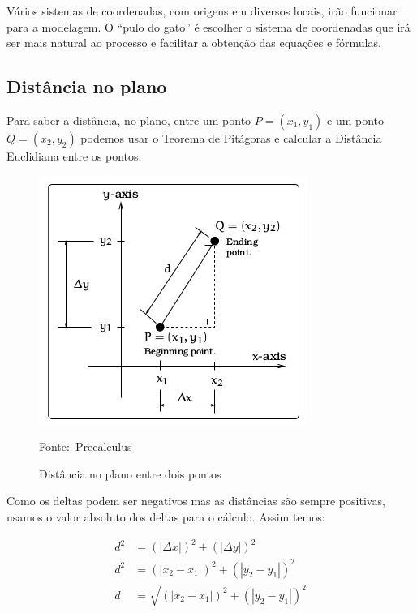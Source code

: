 \documentclass[pdftex, brazil, 12pt, twoside]{article}
\begin{document}
Vários sistemas de coordenadas, com origens em diversos locais, irão funcionar
para a modelagem. O ``pulo do gato'' é escolher o sistema de coordenadas que
irá ser mais natural ao processo e facilitar a obtenção das equações e fórmulas.

\subsection{Distância no plano}
\label{sistema-coordenadas-distancia-plano}

Para saber a distância, no plano, entre um ponto $P = (x_1, y_1)$ e um ponto
$Q = (x_2, y_2)$ podemos usar o Teorema de Pitágoras e calcular a Distância Euclidiana
entre os pontos:

\begin{figure}[ht]
  \begin{center}
    \caption{Distância no plano entre dois pontos}
    \label{fig:distancia-plano}
    \includegraphics[scale=0.9]{imagens/distancia.png}
    
    \footnotesize{Fonte:~Precalculus}
  \end{center}
\end{figure}

Como os deltas podem ser negativos mas as distâncias são sempre positivas, usamos
o valor absoluto dos deltas para o cálculo. Assim temos:

\begin{equation}
  \begin{split}
    d^2 & = (|\Delta x|)^2 + (|\Delta y|)^2\\
    d^2 & = (|x_2 - x_1|)^2 + (|y_2 - y_1|)^2\\
      d & = \sqrt{(|x_2 - x_1|)^2 + (|y_2 - y_1|)^2}
  \end{split}
\end{equation}
\end{document}
